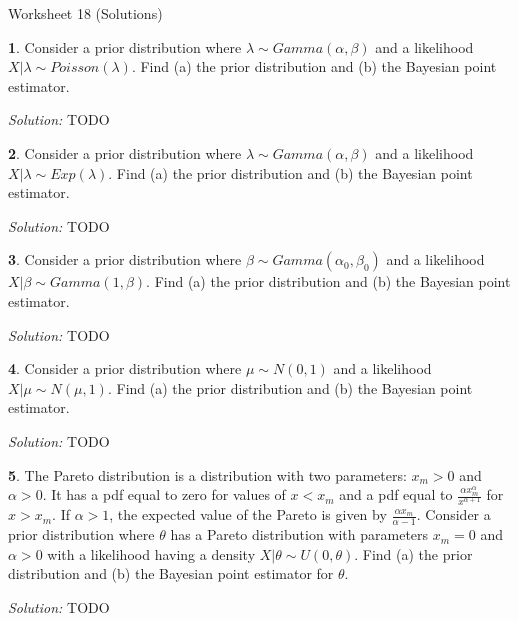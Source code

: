 \documentclass{tufte-handout}
\begin{document}
\justify

{\LARGE Worksheet 18 (Solutions)}

\vspace*{18pt}


\textbf{1}. Consider a prior distribution where $\lambda \sim Gamma(\alpha, \beta)$ and a 
likelihood $X|\lambda \sim Poisson(\lambda)$. Find (a) the prior distribution
and (b) the Bayesian point estimator.

\textit{Solution:} TODO

\textbf{2}. Consider a prior distribution where $\lambda \sim Gamma(\alpha, \beta)$ and a 
likelihood $X|\lambda \sim Exp(\lambda)$. Find (a) the prior distribution
and (b) the Bayesian point estimator.

\textit{Solution:} TODO

\textbf{3}. Consider a prior distribution where $\beta \sim Gamma(\alpha_0, \beta_0)$ and a 
likelihood $X|\beta \sim Gamma(1, \beta)$. Find (a) the prior distribution
and (b) the Bayesian point estimator.

\textit{Solution:} TODO

\textbf{4}. Consider a prior distribution where $\mu \sim N(0, 1)$ and a 
likelihood $X|\mu \sim N(\mu, 1)$. Find (a) the prior distribution
and (b) the Bayesian point estimator.

\textit{Solution:} TODO

\textbf{5}. The Pareto distribution is a distribution with two parameters:
$x_m>0$ and $\alpha > 0$. It has a pdf equal to zero for values of $x < x_m$
and a pdf equal to $\frac{\alpha x_m^\alpha}{x^{\alpha + 1}}$ for $x > x_m$.
If $\alpha > 1$, the expected value of the Pareto is given by
$\frac{\alpha x_m}{\alpha - 1}$. Consider a prior distribution where $\theta$
has a Pareto distribution with parameters $x_m=0$ and $\alpha > 0$ with a
likelihood having a density $X|\theta \sim U(0, \theta)$.
Find (a) the prior distribution and (b) the Bayesian point estimator for $\theta$.

\textit{Solution:} TODO
\end{document}
